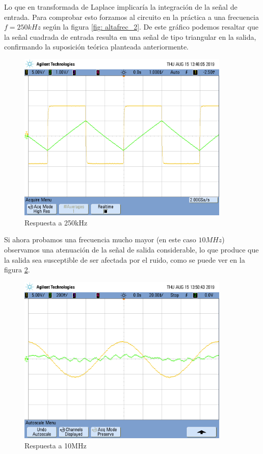 Lo que en transformada de Laplace implicar\'ia la integraci\'on de la se\~nal de entrada. Para comprobar esto forzamos al circuito en la pr\'actica a una frecuencia $f=250kHz$ seg\'un la figura \ref{fig: altafrec_2}. De este gr\'afico podemos resaltar que la se\~nal cuadrada de entrada resulta en una se\~nal de tipo triangular en la salida, confirmando la suposici\'on te\'orica planteada anteriormente.

\begin{figure}[H]
    \centering
    \includegraphics[width=0.9\textwidth]{./EJ2/EJ2_integrador.png}
    \caption{Respuesta a 250kHz}
    \label{fig:altafrec_2} 
\end{figure}

 Si ahora probamos una frecuencia mucho mayor (en este caso $10MHz$) observamos una atenuaci\'on de la se\~nal de salida considerable, lo que produce que la salida sea susceptible de ser afectada por el ruido, como se puede ver en la figura \ref{fig:noise_2}.
 
 \begin{figure}[H]
    \centering
    \includegraphics[width=0.9\textwidth]{./EJ2/EJ2_rta_alta_frec.png}
    \caption{Respuesta a 10MHz}
    \label{fig:noise_2}
\end{figure}
 
